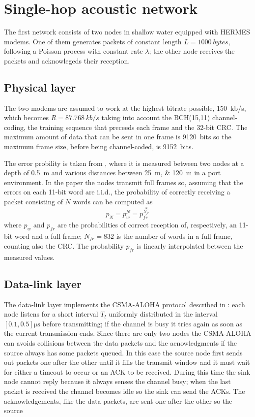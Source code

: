 \section{Single-hop acoustic network}
The first network consists of two nodes in shallow water equipped with
HERMES modems. One of them generates packets of constant length
$L=\SI{1000}{bytes}$, following a Poisson process with constant rate
$\lambda$; the other node receives the packets and acknowlegeds their
reception.

\subsection{Physical layer}
The two modems are assumed to work at the highest bitrate possible,
\SI{150}{kb/s}, which becomes $R = \SI{87.768}{kb/s}$ taking into
account the BCH(15,11) channel-coding, the training sequence that
preceeds each frame and the 32-bit CRC.
%
The maximum amount of data that can be sent in one frame
is \SI{9120}{bits} so the maximum frame size, before being
channel-coded, is \SI{9152}{bits}.

The error probility is taken from \cite{hermes}, where it is measured
between two nodes at a depth of \SI{0.5}{\m} and various distances
between \SIlist{25; 120}{\m} in a port environment. In the paper the
nodes transmit full frames so, assuming that the errors on each 11-bit
word are i.i.d., the probability of correctly receiving a packet
consisting of $N$ words can be computed as
\begin{equation}
  p_N = p_w^N = p_{\mathit{fr}}^\frac{N}{N_{\mathit{fr}}}
  \label{eq:pN}
\end{equation}
where $p_w$ and $p_{\mathit{fr}}$ are the probabilities of correct
reception of, respectively, an 11-bit word and a full frame;
$N_{\mathit{fr}} = 832$ is the number of words in a full frame,
counting also the CRC.
%
The probability $p_{\mathit{fr}}$ is linearly interpolated between the
measured values.

\subsection{Data-link layer}
The data-link layer implements the CSMA-ALOHA protocol described
in \cite{proto_issues}: each node listens for a short interval $T_l$
uniformly distributed in the interval $[0.1,0.5]\si{\micro\s}$ before
transmitting; if the channel is busy it tries again as soon as the
current transmission ends.
%
Since there are only two nodes the CSMA-ALOHA can avoids collisions
between the data packets and the acnowledgments if the source always
has some packets queued.
%
In this case the source node first sends out packets one after the
other until it fills the transmit window and it must wait for either a
timeout to occur or an ACK to be received. During this time the sink
node cannot reply because it always senses the channel busy; when the
last packet is received the channel becomes idle so the sink can send
the ACKs. The acknowledgements, like the data packets, are sent one
after the other so the source 


